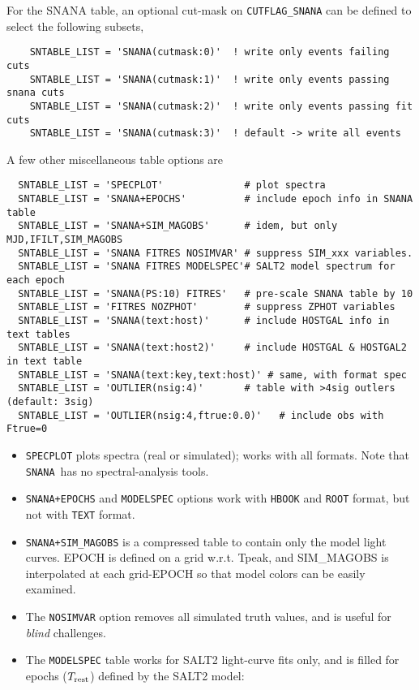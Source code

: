 \documentclass[12pt]{article}
\newcommand{\Trest}{T_{\rm rest}}
\newcommand{\snana}{{\tt SNANA}}
\begin{document}
{For the SNANA table, an optional cut-mask on {\tt CUTFLAG\_SNANA} can
be defined to select the following subsets,
\begin{verbatim}
    SNTABLE_LIST = 'SNANA(cutmask:0)'  ! write only events failing cuts
    SNTABLE_LIST = 'SNANA(cutmask:1)'  ! write only events passing snana cuts
    SNTABLE_LIST = 'SNANA(cutmask:2)'  ! write only events passing fit cuts
    SNTABLE_LIST = 'SNANA(cutmask:3)'  ! default -> write all events
\end{verbatim}


\clearpage
A few other miscellaneous table options are
%
\begin{verbatim}
  SNTABLE_LIST = 'SPECPLOT'              # plot spectra
  SNTABLE_LIST = 'SNANA+EPOCHS'          # include epoch info in SNANA table
  SNTABLE_LIST = 'SNANA+SIM_MAGOBS'      # idem, but only MJD,IFILT,SIM_MAGOBS
  SNTABLE_LIST = 'SNANA FITRES NOSIMVAR' # suppress SIM_xxx variables.
  SNTABLE_LIST = 'SNANA FITRES MODELSPEC'# SALT2 model spectrum for each epoch
  SNTABLE_LIST = 'SNANA(PS:10) FITRES'   # pre-scale SNANA table by 10
  SNTABLE_LIST = 'FITRES NOZPHOT'        # suppress ZPHOT variables
  SNTABLE_LIST = 'SNANA(text:host)'      # include HOSTGAL info in text tables
  SNTABLE_LIST = 'SNANA(text:host2)'     # include HOSTGAL & HOSTGAL2 in text table
  SNTABLE_LIST = 'SNANA(text:key,text:host)' # same, with format spec
  SNTABLE_LIST = 'OUTLIER(nsig:4)'       # table with >4sig outlers (default: 3sig)
  SNTABLE_LIST = 'OUTLIER(nsig:4,ftrue:0.0)'   # include obs with Ftrue=0
\end{verbatim}
%
\begin{itemize}
  \item {\tt SPECPLOT} plots spectra (real or simulated); works with
     all formats. Note that \snana\ has no spectral-analysis tools.
%
\item {\tt SNANA+EPOCHS} and {\tt MODELSPEC} options work with 
{\tt HBOOK} and {\tt ROOT} format, but not with {\tt TEXT} format. 
%
\item {\tt SNANA+SIM\_MAGOBS} is a compressed table to contain
  only the model light curves. EPOCH is defined on a grid w.r.t. Tpeak,
  and SIM\_MAGOBS is interpolated at each grid-EPOCH so that model
  colors can be easily examined.
\item
The {\tt NOSIMVAR} option removes all simulated truth values, 
and is useful for {\it blind} challenges. 
%
\item
The {\tt MODELSPEC} table works for SALT2 light-curve fits only, 
and is filled for epochs ($\Trest$) defined by the SALT2 model: 

\end{itemize}}
\end{document}
